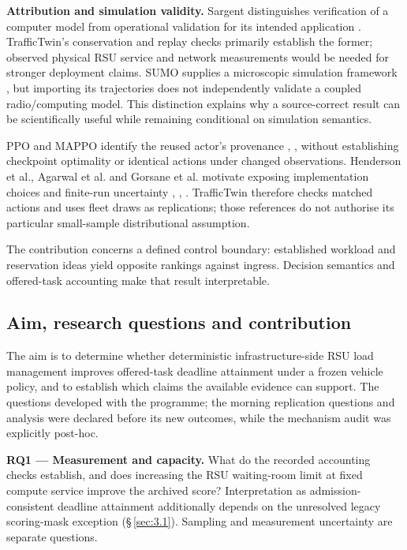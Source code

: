 \documentclass[11pt,a4paper]{article}
\begin{document}
\textbf{Attribution and simulation validity.} Sargent distinguishes verification of a computer model from operational validation for its intended application \cite{ref12}. TrafficTwin's conservation and replay checks primarily establish the former; observed physical RSU service and network measurements would be needed for stronger deployment claims. SUMO supplies a microscopic simulation framework \cite{ref8}, but importing its trajectories does not independently validate a coupled radio/computing model. This distinction explains why a source-correct result can be scientifically useful while remaining conditional on simulation semantics.

PPO and MAPPO identify the reused actor's provenance \cite{ref3}, \cite{ref4}, without establishing checkpoint optimality or identical actions under changed observations. Henderson et al., Agarwal et al. and Gorsane et al. motivate exposing implementation choices and finite-run uncertainty \cite{ref5}, \cite{ref6}, \cite{ref7}. TrafficTwin therefore checks matched actions and uses fleet draws as replications; those references do not authorise its particular small-sample distributional assumption.

The contribution concerns a defined control boundary: established workload and reservation ideas yield opposite rankings against ingress. Decision semantics and offered-task accounting make that result interpretable.

\subsection{Aim, research questions and contribution}\label{sec:1.3}

The aim is to determine whether deterministic infrastructure-side RSU load management improves offered-task deadline attainment under a frozen vehicle policy, and to establish which claims the available evidence can support. The questions developed with the programme; the morning replication questions and analysis were declared before its new outcomes, while the mechanism audit was explicitly post-hoc.

\textbf{RQ1 --- Measurement and capacity.} What do the recorded accounting checks establish, and does increasing the RSU waiting-room limit at fixed compute service improve the archived score? Interpretation as admission-consistent deadline attainment additionally depends on the unresolved legacy scoring-mask exception (\S\,\ref{sec:3.1}). Sampling and measurement uncertainty are separate questions.
\end{document}
